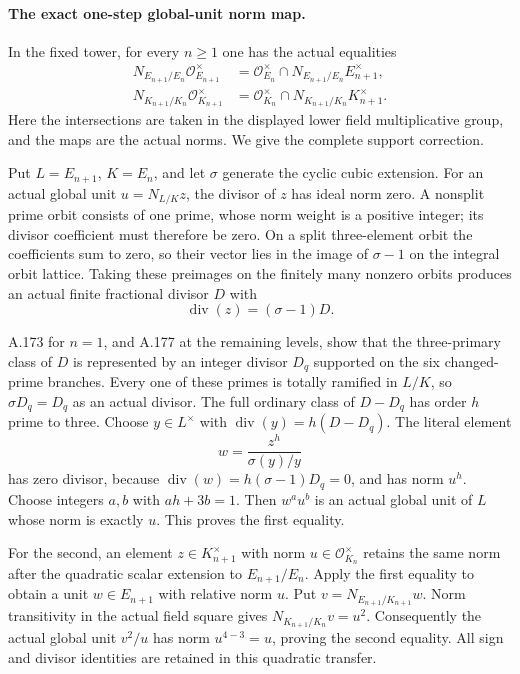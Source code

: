 \paragraph{The exact one-step global-unit norm map.}
In the fixed tower, for every \(n\ge1\) one has the actual
equalities
\[
\begin{aligned}
 N_{E_{n+1}/E_n}\mathcal O_{E_{n+1}}^\times
   &=\mathcal O_{E_n}^\times\cap
                         N_{E_{n+1}/E_n}E_{n+1}^\times,\\
 N_{K_{n+1}/K_n}\mathcal O_{K_{n+1}}^\times
   &=\mathcal O_{K_n}^\times\cap
                         N_{K_{n+1}/K_n}K_{n+1}^\times.
\end{aligned}
\]
Here the intersections are taken in the displayed lower field
multiplicative group, and the maps are the actual norms.
We give the complete support correction.

Put \(L=E_{n+1}\), \(K=E_n\), and let \(\sigma\) generate
the cyclic cubic extension.  For an actual global unit
\(u=N_{L/K}z\), the divisor of \(z\) has ideal norm zero.
A nonsplit prime orbit consists of one prime, whose norm weight
is a positive integer; its divisor coefficient must therefore
be zero.  On a split three-element orbit the coefficients sum
to zero, so their vector lies in the image of \(\sigma-1\)
on the integral orbit lattice.  Taking these preimages on
the finitely many nonzero orbits produces an actual finite
fractional divisor \(D\) with
\[
                         \operatorname{div}(z)=(\sigma-1)D.
\]

A.173 for \(n=1\), and A.177 at the remaining levels,
show that the three-primary class of \(D\) is represented by
an integer divisor \(D_q\) supported on the six changed-prime
branches.  Every one of these primes is totally ramified in
\(L/K\), so \(\sigma D_q=D_q\) as an actual divisor.
The full ordinary class of \(D-D_q\) has order \(h\) prime
to three.  Choose \(y\in L^\times\) with
\(\operatorname{div}(y)=h(D-D_q)\).  The literal element
\[
                    w=\frac{z^h}{\sigma(y)/y}
\]
has zero divisor, because
\(\operatorname{div}(w)=h(\sigma-1)D_q=0\),
and has norm \(u^h\).  Choose integers \(a,b\) with
\(ah+3b=1\).  Then \(w^a u^b\) is an actual global
unit of \(L\) whose norm is exactly \(u\).
This proves the first equality.

For the second, an element \(z\in K_{n+1}^\times\)
with norm \(u\in\mathcal O_{K_n}^\times\) retains the
same norm after the quadratic scalar extension to
\(E_{n+1}/E_n\).  Apply the first equality to obtain a
unit \(w\in E_{n+1}\) with relative norm \(u\).
Put \(v=N_{E_{n+1}/K_{n+1}}w\).
Norm transitivity in the actual field square gives
\(N_{K_{n+1}/K_n}v=u^2\).
Consequently the actual global unit \(v^2/u\) has norm
\(u^{4-3}=u\), proving the second equality.
All sign and divisor identities are retained in this
quadratic transfer.


